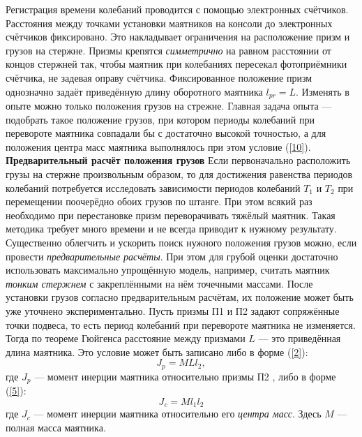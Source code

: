 \documentclass[a4paper, 12pt]{article}
\begin{document}
Регистрация времени колебаний проводится с помощью электронных счётчиков. Расстояния между точками установки маятников на консоли до электронных счётчиков фиксировано. Это накладывает ограничения на расположение призм и грузов на стержне. Призмы крепятся \textit{симметрично} на равном расстоянии от концов стержней так, чтобы маятник при колебаниях пересекал фотоприёмники счётчика, не задевая оправу счётчика. \newline
Фиксированное положение призм однозначно задаёт приведённую длину оборотного маятника $l_{pr} = L$. Изменять в опыте можно только положения грузов на стрежне. Главная задача опыта — подобрать такое положение грузов, при котором периоды колебаний при перевороте маятника совпадали бы с достаточно высокой точностью, а для положения центра масс маятника выполнялось при этом условие (\ref{10}).\newline
\textbf{Предварительный расчёт положения грузов}\newline
Если первоначально расположить грузы на стержне произвольным образом, то для достижения равенства периодов колебаний потребуется исследовать зависимости периодов колебаний $T_1$ и $T_2$ при перемещении поочерёдно обоих грузов по штанге. При этом всякий раз необходимо при перестановке призм переворачивать тяжёлый маятник. Такая методика требует много времени и не всегда приводит к нужному результату.\newline
Существенно облегчить и ускорить поиск нужного положения грузов можно, если провести \textit{предварительные расчёты}. При этом для грубой оценки достаточно использовать максимально упрощённую модель, например, считать маятник \textit{тонким стержнем} с закреплёнными на нём точечными массами. После установки грузов согласно предварительным расчётам, их положение может быть уже уточнено экспериментально. \newline
Пусть призмы П1 и П2 задают сопряжённые точки подвеса, то есть период колебаний при перевороте маятника не изменяется. Тогда по теореме Гюйгенса расстояние между призмами $L$ — это приведённая длина маятника. Это условие может быть записано либо в форме (\ref{2}):
\begin{equation}
    \label{13}
    J_p = MLl_2,
\end{equation}
где $J_p$ — момент инерции маятника относительно призмы П2 , либо в форме (\ref{5}):
\begin{equation}
    \label{13'}
    J_c = Ml_1l_2
\end{equation}
где $J_c$ — момент инерции маятника относительно его \textit{центра масс}. Здесь $M$ — полная масса маятника.
\end{document}
